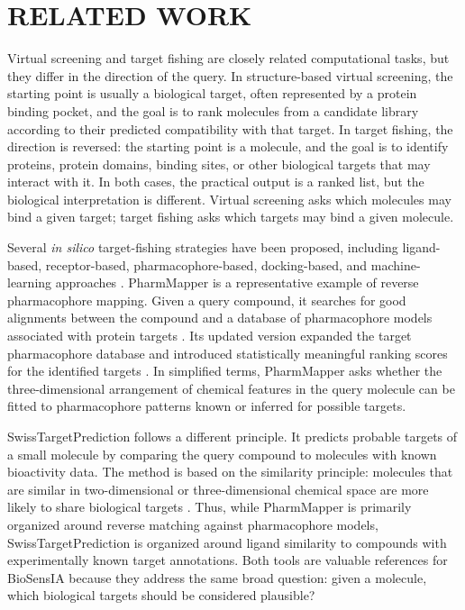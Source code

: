 \documentclass[12pt,fleqn]{article}
\begin{document}
\section{RELATED WORK}

Virtual screening and target fishing are closely related computational
tasks, but they differ in the direction of the query. In
structure-based virtual screening, the starting point is usually a
biological target, often represented by a protein binding pocket, and
the goal is to rank molecules from a candidate library according to
their predicted compatibility with that target. In target fishing, the
direction is reversed: the starting point is a molecule, and the goal
is to identify proteins, protein domains, binding sites, or other
biological targets that may interact with it. In both cases, the
practical output is a ranked list, but the biological interpretation
is different. Virtual screening asks which molecules may bind a given
target; target fishing asks which targets may bind a given molecule.

Several \emph{in silico} target-fishing strategies have been proposed,
including ligand-based, receptor-based, pharmacophore-based,
docking-based, and machine-learning approaches
\citep{galati21:_recen_advan_in_silic_target_fishin}. PharmMapper is a
representative example of reverse pharmacophore mapping. Given a query
compound, it searches for good alignments between the compound and a
database of pharmacophore models associated with protein targets
\citep{liu10:_pharm}. Its updated version expanded the target
pharmacophore database and introduced statistically meaningful ranking
scores for the identified targets \citep{wang17:_pharm}. In simplified
terms, PharmMapper asks whether the three-dimensional arrangement of
chemical features in the query molecule can be fitted to pharmacophore
patterns known or inferred for possible targets.

SwissTargetPrediction follows a different principle. It predicts
probable targets of a small molecule by comparing the query compound
to molecules with known bioactivity data. The method is based on the
similarity principle: molecules that are similar in two-dimensional or
three-dimensional chemical space are more likely to share biological
targets \citep{daina19:_swiss}. Thus, while PharmMapper is primarily
organized around reverse matching against pharmacophore models,
SwissTargetPrediction is organized around ligand similarity to
compounds with experimentally known target annotations. Both tools are
valuable references for BioSensIA because they address the same broad
question: given a molecule, which biological targets should be
considered plausible?
\end{document}
